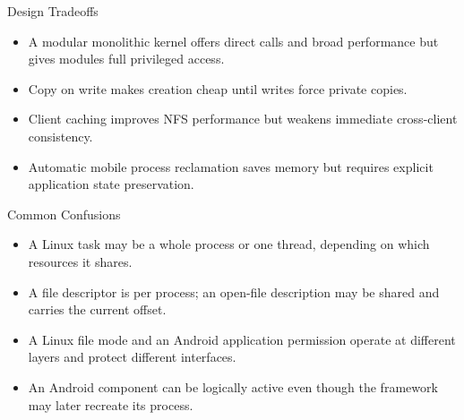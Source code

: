 \documentclass[10pt,letterpaper]{article}
\begin{document}
\begin{studybox}{Design Tradeoffs}
\begin{itemize}
  \item A modular monolithic kernel offers direct calls and broad performance but gives modules full privileged access.
  \item Copy on write makes creation cheap until writes force private copies.
  \item Client caching improves NFS performance but weakens immediate cross-client consistency.
  \item Automatic mobile process reclamation saves memory but requires explicit application state preservation.
\end{itemize}
\end{studybox}

\begin{studybox}{Common Confusions}
\begin{itemize}
  \item A Linux task may be a whole process or one thread, depending on which resources it shares.
  \item A file descriptor is per process; an open-file description may be shared and carries the current offset.
  \item A Linux file mode and an Android application permission operate at different layers and protect different interfaces.
  \item An Android component can be logically active even though the framework may later recreate its process.
\end{itemize}
\end{studybox}
\end{document}
